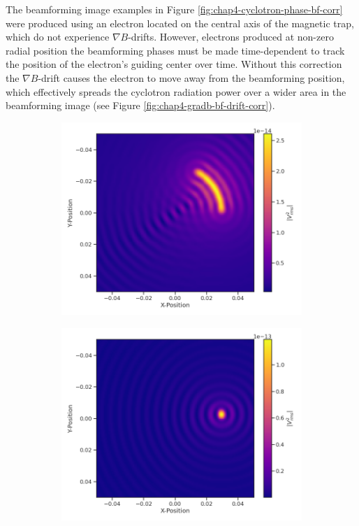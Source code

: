 The beamforming image examples in Figure \ref{fig:chap4-cyclotron-phase-bf-corr} were produced using an electron located on the central axis of the magnetic trap, which do not experience $\nabla B$-drifts. However, electrons produced at non-zero radial position the beamforming phases must be made time-dependent to track the position of the electron's guiding center over time. Without this correction the $\nabla B$-drift causes the electron to move away from the beamforming position, which effectively spreads the cyclotron radiation power over a wider area in the beamforming image (see Figure \ref{fig:chap4-gradb-bf-drift-corr}).
\begin{figure}[htbp]
    \centering
    \begin{subfigure}{0.45\textwidth}
        \includegraphics[width=\textwidth]{figs/Chapter-4/220318_88deg_electron_3cm_no_correction.png}
        \caption{}
    \end{subfigure}
    \hfill
    \begin{subfigure}{0.45\textwidth}
        \includegraphics[width=\textwidth]{figs/Chapter-4/220318_88deg_electron_3cm_corrected.png}

\end{subfigure}
\end{figure}
